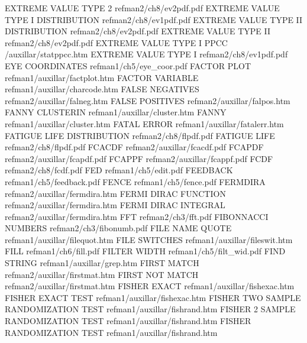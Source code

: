 EXTREME VALUE TYPE 2                    refman2/ch8/ev2pdf.pdf
EXTREME VALUE TYPE I DISTRIBUTION       refman2/ch8/ev1pdf.pdf
EXTREME VALUE TYPE II DISTRIBUTION      refman2/ch8/ev2pdf.pdf
EXTREME VALUE TYPE II                   refman2/ch8/ev2pdf.pdf
EXTREME VALUE TYPE I PPCC               /auxillar/statppcc.htm
EXTREME VALUE TYPE I                    refman2/ch8/ev1pdf.pdf
EYE COORDINATES                         refman1/ch5/eye_coor.pdf
FACTOR PLOT                             refman1/auxillar/factplot.htm
FACTOR VARIABLE                         refman1/auxillar/charcode.htm
FALSE NEGATIVES                         refman2/auxillar/falneg.htm
FALSE POSITIVES                         refman2/auxillar/falpos.htm
FANNY CLUSTERIN                         refman1/auxillar/cluster.htm
FANNY                                   refman1/auxillar/cluster.htm
FATAL ERROR                             refman1/auxillar/fatalerr.htm
FATIGUE LIFE DISTRIBUTION               refman2/ch8/flpdf.pdf
FATIGUE LIFE                            refman2/ch8/flpdf.pdf
FCACDF                                  refman2/auxillar/fcacdf.pdf
FCAPDF                                  refman2/auxillar/fcapdf.pdf
FCAPPF                                  refman2/auxillar/fcappf.pdf
FCDF                                    refman2/ch8/fcdf.pdf
FED                                     refman1/ch5/edit.pdf
FEEDBACK                                refman1/ch5/feedback.pdf
FENCE                                   refman1/ch5/fence.pdf
FERMDIRA                                refman2/auxillar/fermdira.htm
FERMI DIRAC FUNCTION                    refman2/auxillar/fermdira.htm
FERMI DIRAC INTEGRAL                    refman2/auxillar/fermdira.htm
FFT                                     refman2/ch3/fft.pdf
FIBONNACCI NUMBERS                      refman2/ch3/fibonumb.pdf
FILE NAME QUOTE                         refman1/auxillar/filequot.htm
FILE SWITCHES                           refman1/auxillar/fileswit.htm
FILL                                    refman1/ch6/fill.pdf
FILTER WIDTH                            refman1/ch5/filt_wid.pdf
FIND STRING                             refman1/auxillar/grep.htm
FIRST MATCH                             refman2/auxillar/firstmat.htm
FIRST NOT MATCH                         refman2/auxillar/firstmat.htm
FISHER EXACT                            refman1/auxillar/fishexac.htm
FISHER EXACT TEST                       refman1/auxillar/fishexac.htm
FISHER TWO SAMPLE RANDOMIZATION TEST    refman1/auxillar/fishrand.htm
FISHER 2 SAMPLE RANDOMIZATION TEST      refman1/auxillar/fishrand.htm
FISHER RANDOMIZATION TEST               refman1/auxillar/fishrand.htm
